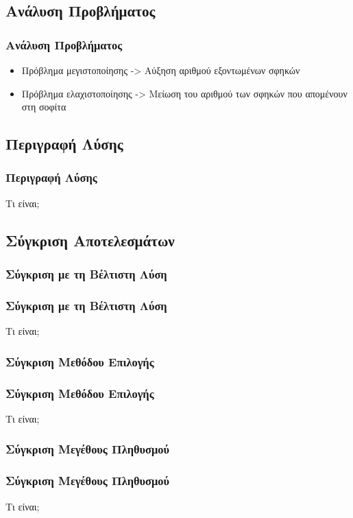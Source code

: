 \documentclass[xetex,mathserif,serif,14pt]{beamer}
\begin{document}
\subsection{Ανάλυση Προβλήματος}

\begin{frame}
\frametitle{Ανάλυση Προβλήματος}
\begin{itemize}
  \item Πρόβλημα μεγιστοποίησης -> Αύξηση αριθμού εξοντωμένων σφηκών
  \item Πρόβλημα ελαχιστοποίησης -> Μείωση του αριθμού των σφηκών που απομένουν στη σοφίτα
\end{itemize}
\end{frame}

\subsection{Περιγραφή Λύσης}

\begin{frame}
\frametitle{Περιγραφή Λύσης}
Τι είναι;
\end{frame}

\subsection{Σύγκριση Αποτελεσμάτων}

\subsubsection{Σύγκριση με τη Βέλτιστη Λύση}
\begin{frame}
\frametitle{Σύγκριση με τη Βέλτιστη Λύση}
Τι είναι;
\end{frame}

\subsubsection{Σύγκριση Μεθόδου Επιλογής}
\begin{frame}
\frametitle{Σύγκριση Μεθόδου Επιλογής}
Τι είναι;
\end{frame}

\subsubsection{Σύγκριση Μεγέθους Πληθυσμού}

\begin{frame}
\frametitle{Σύγκριση Μεγέθους Πληθυσμού}
Τι είναι;
\end{frame}
\end{document}
